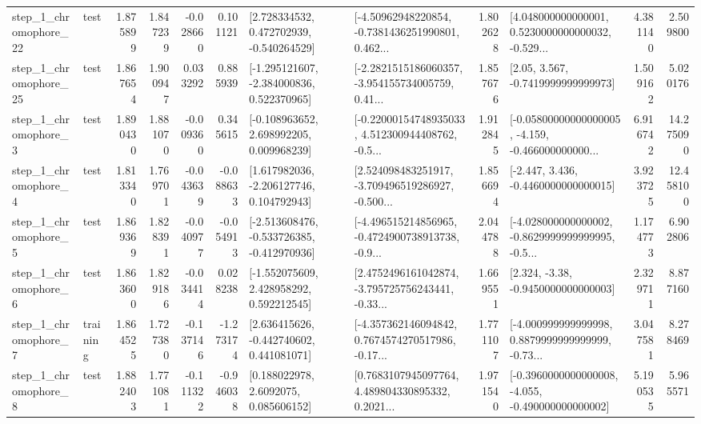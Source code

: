 \begin{tabular}{llrrrrllrlrr}
    step\_1\_chromophore\_22 &      test &      1.875899 &    1.847239 &     -0.028660 &  0.101121 &    [2.728334532, 0.472702939, -0.540264529] &  [-4.50962948220854, -0.7381436251990801, 0.462... &       1.802628 &  [4.048000000000001, 0.5230000000000032, -0.529... &            4.381140 &          2.509800 \\
    step\_1\_chromophore\_25 &      test &      1.867654 &    1.900947 &      0.033292 &  0.885939 &   [-1.295121607, -2.384000836, 0.522370965] &  [-2.2821515186060357, -3.954155734005759, 0.41... &       1.857676 &                 [2.05, 3.567, -0.7419999999999973] &            1.509162 &          5.020176 \\
     step\_1\_chromophore\_3 &      test &      1.890430 &    1.881070 &     -0.009360 &  0.345615 &    [-0.108963652, 2.698992205, 0.009968239] &  [-0.22000154748935033, 4.512300944408762, -0.5... &       1.912845 &  [-0.05800000000000005, -4.159, -0.466000000000... &            6.916742 &         14.275090 \\
     step\_1\_chromophore\_4 &      test &      1.813340 &    1.769701 &     -0.043639 & -0.088633 &    [1.617982036, -2.206127746, 0.104792943] &  [2.524098483251917, -3.709496519286927, -0.500... &       1.856694 &               [-2.447, 3.436, -0.4460000000000015] &            3.923725 &         12.458100 \\
     step\_1\_chromophore\_5 &      test &      1.869369 &    1.828391 &     -0.040977 & -0.054913 &  [-2.513608476, -0.533726385, -0.412970936] &  [-4.496515214856965, -0.4724900738913738, -0.9... &       2.044788 &  [-4.028000000000002, -0.8629999999999995, -0.5... &            1.174773 &          6.902806 \\
     step\_1\_chromophore\_6 &      test &      1.863600 &    1.829186 &     -0.034414 &  0.028238 &    [-1.552075609, 2.428958292, 0.592212545] &  [2.4752496161042874, -3.795725756243441, -0.33... &       1.669551 &                [2.324, -3.38, -0.9450000000000003] &            2.329711 &          8.877160 \\
     step\_1\_chromophore\_7 &  training &      1.864525 &    1.727380 &     -0.137146 & -1.273174 &    [2.636415626, -0.442740602, 0.441081071] &  [-4.357362146094842, 0.7674574270517986, -0.17... &       1.771107 &  [-4.000999999999998, 0.8879999999999999, -0.73... &            3.047581 &          8.278469 \\
     step\_1\_chromophore\_8 &      test &      1.882403 &    1.771081 &     -0.111322 & -0.946038 &       [0.188022978, 2.6092075, 0.085606152] &  [0.7683107945097764, 4.489804330895332, 0.2021... &       1.971540 &  [-0.3960000000000008, -4.055, -0.490000000000002] &            5.190535 &          5.965571 \\

\end{tabular}
